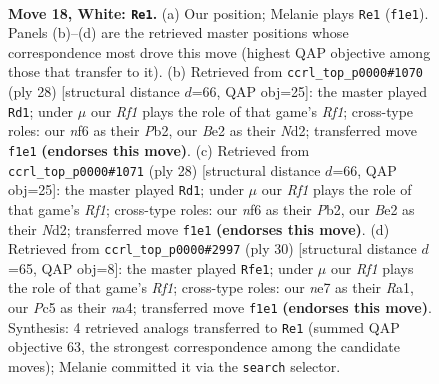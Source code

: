\documentclass[11pt]{article}
\begin{document}
\clearpage

\begin{figure}[p]\centering
\begin{subfigure}{0.46\textwidth}\centering
\resizebox{\linewidth}{!}{%
\newchessgame
\chessboard[
  setfen={r1b2rk1/pp2np1p/4pnp1/2P5/2P5/4P3/P1N1BPPP/1RB2RK1 w - - 0 18},
  showmover=false,
  pgfstyle=straightmove, color=movearrow, markmove={f1-e1}
]}
\caption{}
\end{subfigure}\hfill
\begin{subfigure}{0.46\textwidth}\centering
\resizebox{\linewidth}{!}{%
\newchessgame
\chessboard[
  setfen={1rb2rk1/1p1p1ppp/4p3/p1n5/2P5/2R3P1/PP1NPPBP/5RK1 w - - 0 15},
  showmover=false,
  pgfstyle=straightmove, color=movearrow, markmove={f1-d1}
]}
\caption{}
\end{subfigure}
\\[4pt]
\begin{subfigure}{0.46\textwidth}\centering
\resizebox{\linewidth}{!}{%
\newchessgame
\chessboard[
  setfen={1rb2rk1/1p1p1ppp/4p3/p1n5/2P5/2R3P1/PP1NPPBP/5RK1 w - - 0 15},
  showmover=false,
  pgfstyle=straightmove, color=movearrow, markmove={f1-d1}
]}
\caption{}
\end{subfigure}\hfill
\begin{subfigure}{0.46\textwidth}\centering
\resizebox{\linewidth}{!}{%
\newchessgame
\chessboard[
  setfen={r1b1r1k1/1p2nppp/p3p3/8/nBPN4/P7/P3BPPP/R4RK1 w - - 5 16},
  showmover=false,
  pgfstyle=straightmove, color=movearrow, markmove={f1-e1}
]}
\caption{}
\end{subfigure}
\caption{\textbf{Move 18, White: \texttt{Re1}.} (a) Our position; Melanie plays \texttt{Re1} (\texttt{f1e1}). Panels (b)--(d) are the retrieved master positions whose correspondence most drove this move (highest QAP objective among those that transfer to it). (b) Retrieved from \texttt{ccrl\_top\_p0000\#1070} (ply 28) [structural distance $d$=66, QAP obj=25]: the master played \texttt{Rd1}; under $\mu$ our \emph{Rf1} plays the role of that game's \emph{Rf1}; cross-type roles: our \emph{n}f6 as their \emph{P}b2, our \emph{B}e2 as their \emph{N}d2; transferred move \texttt{f1e1} \textbf{(endorses this move)}. (c) Retrieved from \texttt{ccrl\_top\_p0000\#1071} (ply 28) [structural distance $d$=66, QAP obj=25]: the master played \texttt{Rd1}; under $\mu$ our \emph{Rf1} plays the role of that game's \emph{Rf1}; cross-type roles: our \emph{n}f6 as their \emph{P}b2, our \emph{B}e2 as their \emph{N}d2; transferred move \texttt{f1e1} \textbf{(endorses this move)}. (d) Retrieved from \texttt{ccrl\_top\_p0000\#2997} (ply 30) [structural distance $d$=65, QAP obj=8]: the master played \texttt{Rfe1}; under $\mu$ our \emph{Rf1} plays the role of that game's \emph{Rf1}; cross-type roles: our \emph{n}e7 as their \emph{R}a1, our \emph{P}c5 as their \emph{n}a4; transferred move \texttt{f1e1} \textbf{(endorses this move)}. Synthesis: 4 retrieved analogs transferred to \texttt{Re1} (summed QAP objective 63, the strongest correspondence among the candidate moves); Melanie committed it via the \texttt{search} selector.}
\label{fig:thought-m34}
\end{figure}
\end{document}
